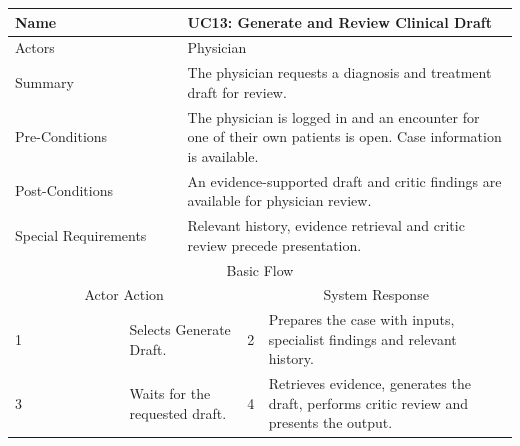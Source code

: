 \begin{reporttable}
\centering
\small
\caption{UC13: Generate and Review Clinical Draft.}
\label{tab:kashaf:uc13}
\begin{tabular}{|p{}|p{}|p{}|p{}|p{}|}
\hline
\multicolumn{2}{|p{\dimexpr0.225\textwidth+2\tabcolsep+\arrayrulewidth\relax}|}{Name} & \multicolumn{3}{p{\dimexpr0.575\textwidth+4\tabcolsep+2\arrayrulewidth\relax}|}{UC13: Generate and Review Clinical Draft} \\ \hline
\multicolumn{2}{|p{\dimexpr0.225\textwidth+2\tabcolsep+\arrayrulewidth\relax}|}{Actors} & \multicolumn{3}{p{\dimexpr0.575\textwidth+4\tabcolsep+2\arrayrulewidth\relax}|}{Physician} \\ \hline
\multicolumn{2}{|p{\dimexpr0.225\textwidth+2\tabcolsep+\arrayrulewidth\relax}|}{Summary} & \multicolumn{3}{p{\dimexpr0.575\textwidth+4\tabcolsep+2\arrayrulewidth\relax}|}{The physician requests a diagnosis and treatment draft for review.} \\ \hline
\multicolumn{2}{|p{\dimexpr0.225\textwidth+2\tabcolsep+\arrayrulewidth\relax}|}{Pre-Conditions} & \multicolumn{3}{p{\dimexpr0.575\textwidth+4\tabcolsep+2\arrayrulewidth\relax}|}{The physician is logged in and an encounter for one of their own patients is open. Case information is available.} \\ \hline
\multicolumn{2}{|p{\dimexpr0.225\textwidth+2\tabcolsep+\arrayrulewidth\relax}|}{Post-Conditions} & \multicolumn{3}{p{\dimexpr0.575\textwidth+4\tabcolsep+2\arrayrulewidth\relax}|}{An evidence-supported draft and critic findings are available for physician review.} \\ \hline
\multicolumn{2}{|p{\dimexpr0.225\textwidth+2\tabcolsep+\arrayrulewidth\relax}|}{Special Requirements} & \multicolumn{3}{p{\dimexpr0.575\textwidth+4\tabcolsep+2\arrayrulewidth\relax}|}{Relevant history, evidence retrieval and critic review precede presentation.} \\ \hline
\multicolumn{5}{|c|}{Basic Flow} \\ \hline
\multicolumn{3}{|c|}{Actor Action} & \multicolumn{2}{c|}{System Response} \\ \hline
1 & \multicolumn{2}{p{\dimexpr0.37\textwidth+2\tabcolsep+\arrayrulewidth\relax}|}{Selects Generate Draft.} & 2 & Prepares the case with inputs, specialist findings and relevant history. \\ \hline
3 & \multicolumn{2}{p{\dimexpr0.37\textwidth+2\tabcolsep+\arrayrulewidth\relax}|}{Waits for the requested draft.} & 4 & Retrieves evidence, generates the draft, performs critic review and presents the output. \\ \hline

\end{tabular}
\end{reporttable}
